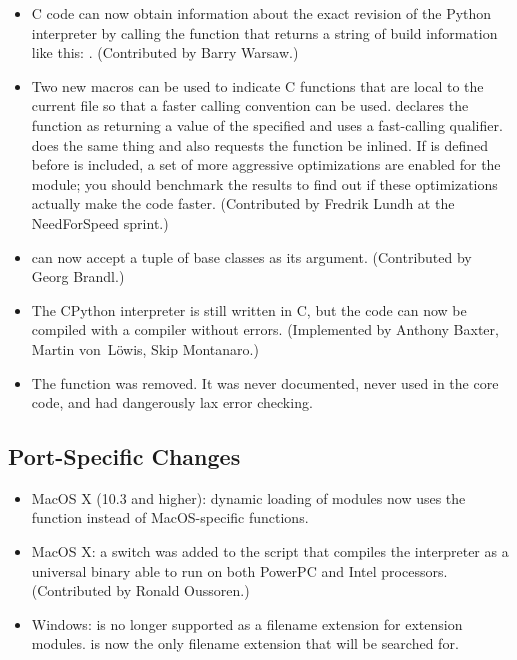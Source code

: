 \documentclass{howto}
\begin{document}
\begin{itemize}
\item C code can now obtain information about the exact revision
of the Python interpreter by calling the 
 function that returns a 
string of build information like this:
.  
(Contributed by Barry Warsaw.)

\item Two new macros can be used to indicate C functions that are
local to the current file so that a faster calling convention can be
used.   declares the function as
returning a value of the specified  and uses a fast-calling
qualifier.  does the same thing
and also requests the function be inlined.  If
 is defined before  is
included, a set of more aggressive optimizations are enabled for the
module; you should benchmark the results to find out if these
optimizations actually make the code faster.  (Contributed by Fredrik
Lundh at the NeedForSpeed sprint.)

\item {} can now accept a tuple of base classes as its 
argument.  (Contributed by Georg Brandl.)

\item The CPython interpreter is still written in C, but 
the code can now be compiled with a {\Cpp} compiler without errors.  
(Implemented by Anthony Baxter, Martin von~L\"owis, Skip Montanaro.)

\item The  function was removed.  It was
never documented, never used in the core code, and had dangerously lax
error checking.

\end{itemize}


\subsection{Port-Specific Changes\label{ports}}

\begin{itemize}

\item MacOS X (10.3 and higher): dynamic loading of modules
now uses the  function instead of MacOS-specific
functions.

\item MacOS X: a  switch was added
to the  script that compiles the interpreter as a
universal binary able to run on both PowerPC and Intel processors.
(Contributed by Ronald Oussoren.)

\item Windows:  is no longer supported as a filename extension for 
extension modules.   is now the only filename extension that will
be searched for.

\end{itemize}
\end{document}

